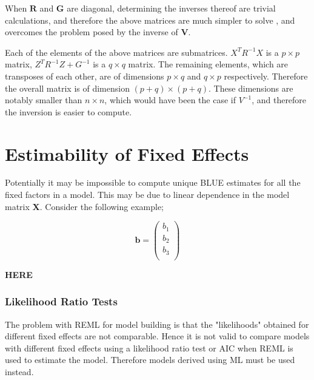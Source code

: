 \documentclass[12pt, a4paper]{report}
\begin{document}
When $\textbf{R}$ and $\textbf{G}$  are diagonal, determining the
inverses thereof are trivial calculations, and therefore the above
matrices are much simpler to solve , and overcomes the problem
posed by the inverse of \textbf{V}.

Each of the elements of the above matrices are submatrices.
$X^{T}R^{-1}X$ is a $p \times p$ matrix, $Z^{T}R^{-1}Z + G^{-1}$
is a $q \times q$ matrix. The remaining elements, which are
transposes of each other, are of dimensions $p \times q$ and $q
\times p$ respectively. Therefore the overall matrix is of
dimension $(p+q) \times (p+q)$. These dimensions are notably
smaller than $n \times n$, which would have been the case if
$V^{-1}$, and therefore the inversion is easier to compute.

\section{Estimability of Fixed Effects}
Potentially it may be impossible to compute unique BLUE estimates for all the fixed factors in a model. This may be due to linear dependence in the model
matrix \textbf{X}. Consider the following example;


\begin{equation}
\textbf{b}= \left( \begin{array}{c}
  b_{1} \\
  b_{2} \\
  b_{3} \\
\end{array}  \right)
\end{equation}

\textbf{HERE}




\subsubsection{Likelihood Ratio Tests} The problem with REML for
model building is that the "likelihoods" obtained for different
fixed effects are not comparable. Hence it is not valid to compare
models with different fixed effects using a likelihood ratio test
or AIC when REML is used to estimate the model. Therefore models
derived using ML must be used instead.





\end{document}
